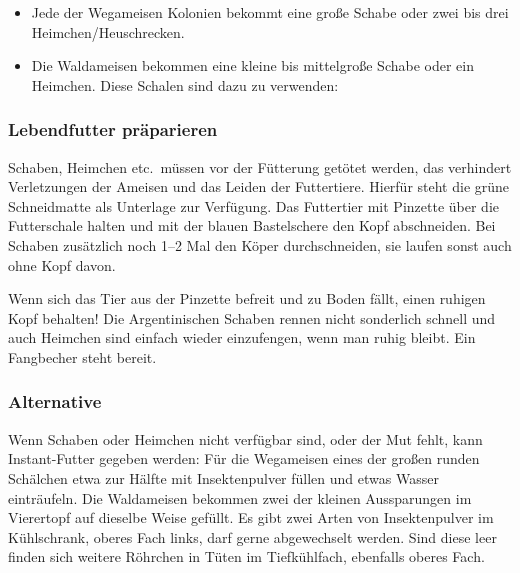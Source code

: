 \begin{itemize}
  \item Jede der Wegameisen Kolonien bekommt eine große Schabe
        oder zwei bis drei Heimchen/Heuschrecken.
  \item Die Waldameisen bekommen eine kleine bis mittelgroße Schabe oder ein Heimchen.
        Diese Schalen sind dazu zu verwenden:
\end{itemize}

\subsubsection{Lebendfutter präparieren}
Schaben, Heimchen etc.\ müssen vor der Fütterung getötet werden,
das verhindert Verletzungen der Ameisen und das Leiden der Futtertiere.
Hierfür steht die grüne Schneidmatte als Unterlage zur Verfügung.
Das Futtertier mit Pinzette über die Futterschale halten und mit der blauen Bastelschere den Kopf abschneiden.
Bei Schaben zusätzlich noch 1--2 Mal den Köper durchschneiden, sie laufen sonst auch ohne Kopf davon.

Wenn sich das Tier aus der Pinzette befreit und zu Boden fällt, einen ruhigen Kopf behalten!
Die Argentinischen Schaben rennen nicht sonderlich schnell
und auch Heimchen sind einfach wieder einzufengen, wenn man ruhig bleibt.
Ein Fangbecher steht bereit.

\subsubsection{Alternative}
Wenn Schaben oder Heimchen nicht verfügbar sind, oder der Mut fehlt, kann Instant-Futter gegeben werden:
Für die Wegameisen eines der großen runden Schälchen etwa zur Hälfte mit Insektenpulver füllen
 und etwas Wasser einträufeln.
Die Waldameisen bekommen zwei der kleinen Aussparungen im Vierertopf auf dieselbe Weise gefüllt.
Es gibt zwei Arten von Insektenpulver im Kühlschrank, oberes Fach links, darf gerne abgewechselt werden.
Sind diese leer finden sich weitere Röhrchen in Tüten im Tiefkühlfach, ebenfalls oberes Fach.

